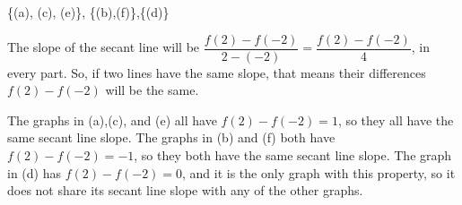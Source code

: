 \begin{answer} \{(a), (c), (e)\}, \quad\{(b),(f)\},\quad \{(d)\}
\end{answer}
\begin{solution} The slope of the secant line will be $\dfrac{f(2)-f(-2)}{2-(-2)} = \dfrac{f(2)-f(-2)}{4}$, in every part. So, if two lines have the same slope, that means their differences $f(2)-f(-2)$ will be the same.

The graphs in (a),(c), and (e) all have $f(2)-f(-2)=1$, so they all have the same secant line slope. The graphs in (b) and (f) both have $f(2)-f(-2)=-1$, so they both have the same secant line slope. The graph in (d) has $f(2)-f(-2)=0$, and it is the only graph with this property, so it does not share its secant line slope with any of the other graphs.
\end{solution}


\subsection*{\Procedural}


